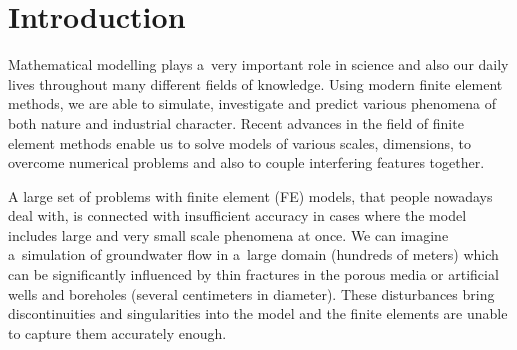 \documentclass[bibliography=totocnumbered,dvipsnames,FM,Dis]{tulthesis}
\begin{document}
\tableofcontents
\clearpage

% 






\chapter{Introduction}





Mathematical modelling plays a~very important role in science and also our daily lives throughout many different
fields of knowledge. Using modern finite element methods, we are able to simulate, investigate and predict
various phenomena of both nature and industrial character. Recent advances in the field of finite element methods
enable us to solve models of various scales, dimensions, to overcome numerical problems and also 
to couple interfering features together.

A large set of problems with finite element (FE) models, that people nowadays deal with, is connected with 
insufficient accuracy in cases where the model includes large and very small scale phenomena at once.
We can imagine a~simulation of groundwater flow in a~large domain (hundreds of meters) which can be significantly
influenced by thin fractures in the porous media or artificial wells and boreholes (several centimeters in diameter).
These disturbances bring discontinuities and singularities into the model and the finite elements are
unable to capture them accurately enough.
\end{document}
